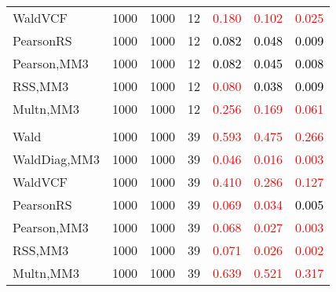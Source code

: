 \documentclass[
]{article}
\begin{document}
\begin{table}[H]
{\begin{tabular}[t]{lrrrrrr}
\hspace{1em}WaldVCF & 1000 & 1000 & 12 & \textcolor{red}{0.180} & \textcolor{red}{0.102} & \textcolor{red}{0.025}\\
\hspace{1em}PearsonRS & 1000 & 1000 & 12 & \textcolor{black}{0.082} & \textcolor{black}{0.048} & \textcolor{black}{0.009}\\
\hspace{1em}Pearson,MM3 & 1000 & 1000 & 12 & \textcolor{black}{0.082} & \textcolor{black}{0.045} & \textcolor{black}{0.008}\\
\hspace{1em}RSS,MM3 & 1000 & 1000 & 12 & \textcolor{red}{0.080} & \textcolor{black}{0.038} & \textcolor{black}{0.009}\\
\hspace{1em}Multn,MM3 & 1000 & 1000 & 12 & \textcolor{red}{0.256} & \textcolor{red}{0.169} & \textcolor{red}{0.061}\\
\addlinespace[0.3em]
\multicolumn{7}{l}{\textbf{3F 15V}}\\
\hspace{1em}Wald & 1000 & 1000 & 39 & \textcolor{red}{0.593} & \textcolor{red}{0.475} & \textcolor{red}{0.266}\\
\hspace{1em}WaldDiag,MM3 & 1000 & 1000 & 39 & \textcolor{red}{0.046} & \textcolor{red}{0.016} & \textcolor{red}{0.003}\\
\hspace{1em}WaldVCF & 1000 & 1000 & 39 & \textcolor{red}{0.410} & \textcolor{red}{0.286} & \textcolor{red}{0.127}\\
\hspace{1em}PearsonRS & 1000 & 1000 & 39 & \textcolor{red}{0.069} & \textcolor{red}{0.034} & \textcolor{black}{0.005}\\
\hspace{1em}Pearson,MM3 & 1000 & 1000 & 39 & \textcolor{red}{0.068} & \textcolor{red}{0.027} & \textcolor{red}{0.003}\\
\hspace{1em}RSS,MM3 & 1000 & 1000 & 39 & \textcolor{red}{0.071} & \textcolor{red}{0.026} & \textcolor{red}{0.002}\\
\hspace{1em}Multn,MM3 & 1000 & 1000 & 39 & \textcolor{red}{0.639} & \textcolor{red}{0.521} & \textcolor{red}{0.317}\\
\bottomrule
\end{tabular}}
\endgroup{}
\end{table}
\end{document}
